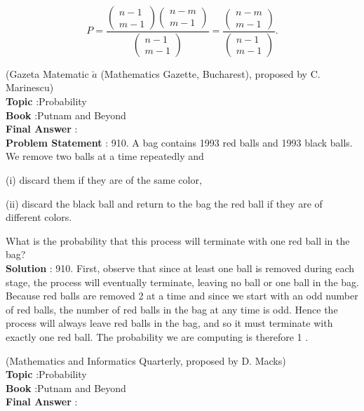\documentclass[10pt]{article}
\begin{document}
$$
P=\frac{\left(\begin{array}{c}
n-1 \\
m-1
\end{array}\right)\left(\begin{array}{c}
n-m \\
m-1
\end{array}\right)}{\left(\begin{array}{c}
n-1 \\
m-1
\end{array}\right)}=\frac{\left(\begin{array}{c}
n-m \\
m-1
\end{array}\right)}{\left(\begin{array}{c}
n-1 \\
m-1
\end{array}\right)} .
$$

(Gazeta Matematic $\breve{a}$ (Mathematics Gazette, Bucharest), proposed by C. Marinescu)
\\
\textbf{Topic} :Probability\\
\textbf{Book} :Putnam and Beyond\\
\textbf{Final Answer} :\\


\textbf{Problem Statement} :
910. A bag contains 1993 red balls and 1993 black balls. We remove two balls at a time repeatedly and

(i) discard them if they are of the same color,

(ii) discard the black ball and return to the bag the red ball if they are of different colors.

What is the probability that this process will terminate with one red ball in the bag?
\\
\textbf{Solution} :
910. First, observe that since at least one ball is removed during each stage, the process will eventually terminate, leaving no ball or one ball in the bag. Because red balls are removed 2 at a time and since we start with an odd number of red balls, the number of red balls in the bag at any time is odd. Hence the process will always leave red balls in the bag, and so it must terminate with exactly one red ball. The probability we are computing is therefore 1 .

(Mathematics and Informatics Quarterly, proposed by D. Macks) 
\\
\textbf{Topic} :Probability\\
\textbf{Book} :Putnam and Beyond\\
\textbf{Final Answer} :\\
\end{document}
